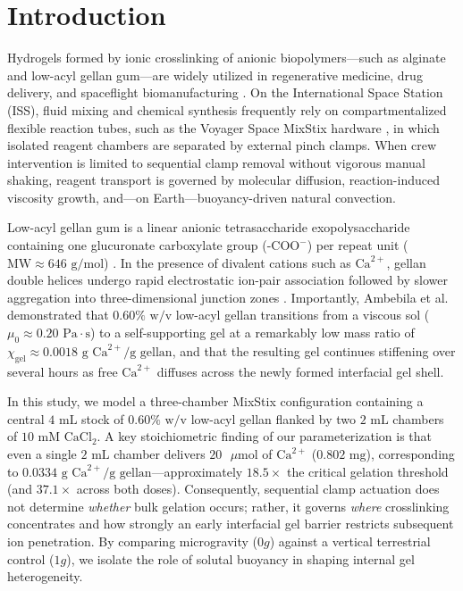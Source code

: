 \documentclass[11pt,twocolumn]{article}
\begin{document}
\section{Introduction}
Hydrogels formed by ionic crosslinking of anionic biopolymers---such as alginate and low-acyl gellan gum---are widely utilized in regenerative medicine, drug delivery, and spaceflight biomanufacturing \cite{ambebila2019,mammarella2003}. On the International Space Station (ISS), fluid mixing and chemical synthesis frequently rely on compartmentalized flexible reaction tubes, such as the Voyager Space MixStix hardware \cite{voyager2026}, in which isolated reagent chambers are separated by external pinch clamps. When crew intervention is limited to sequential clamp removal without vigorous manual shaking, reagent transport is governed by molecular diffusion, reaction-induced viscosity growth, and---on Earth---buoyancy-driven natural convection.

Low-acyl gellan gum is a linear anionic tetrasaccharide exopolysaccharide containing one glucuronate carboxylate group ($\text{-COO}^-$) per repeat unit ($\text{MW} \approx 646\text{ g/mol}$) \cite{ambebila2019}. In the presence of divalent cations such as $\text{Ca}^{2+}$, gellan double helices undergo rapid electrostatic ion-pair association followed by slower aggregation into three-dimensional junction zones \cite{perezcampos2012}. Importantly, Ambebila et al. \cite{ambebila2019} demonstrated that $0.60\%\text{ w/v}$ low-acyl gellan transitions from a viscous sol ($\mu_0 \approx 0.20\text{ Pa}\cdot\text{s}$) to a self-supporting gel at a remarkably low mass ratio of $\chi_{\text{gel}} \approx 0.0018\text{ g Ca}^{2+}/\text{g gellan}$, and that the resulting gel continues stiffening over several hours as free $\text{Ca}^{2+}$ diffuses across the newly formed interfacial gel shell.

In this study, we model a three-chamber MixStix configuration containing a central $4\text{ mL}$ stock of $0.60\%\text{ w/v}$ low-acyl gellan flanked by two $2\text{ mL}$ chambers of $10\text{ mM CaCl}_2$. A key stoichiometric finding of our parameterization is that even a single $2\text{ mL}$ chamber delivers $20\text{ }\mu\text{mol}$ of $\text{Ca}^{2+}$ ($0.802\text{ mg}$), corresponding to $0.0334\text{ g Ca}^{2+}/\text{g gellan}$---approximately $18.5\times$ the critical gelation threshold (and $37.1\times$ across both doses). Consequently, sequential clamp actuation does not determine \emph{whether} bulk gelation occurs; rather, it governs \emph{where} crosslinking concentrates and how strongly an early interfacial gel barrier restricts subsequent ion penetration. By comparing microgravity ($0g$) against a vertical terrestrial control ($1g$), we isolate the role of solutal buoyancy in shaping internal gel heterogeneity.
\end{document}
